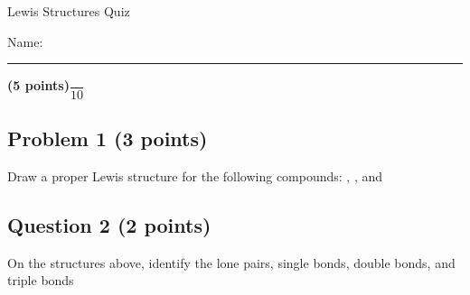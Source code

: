 \documentclass[12pt, letterpaper]{memoir}
\begin{document}
	\begin{center}
		{\large Lewis Structures Quiz}
	\end{center}
	{\large Name: \rule[-1mm]{4in}{.1pt} {\bfseries (5 points)}\hspace{4em}$\dfrac{~}{10}$} 
	
	\subsection*{Problem 1 (3 points)}
	Draw a proper Lewis structure for the following compounds: , , and 
	
	\vspace{36em}
	\subsection*{Question 2 (2 points)}
	On the structures above, identify the lone pairs, single bonds, double bonds, and triple bonds
	
\end{document}
